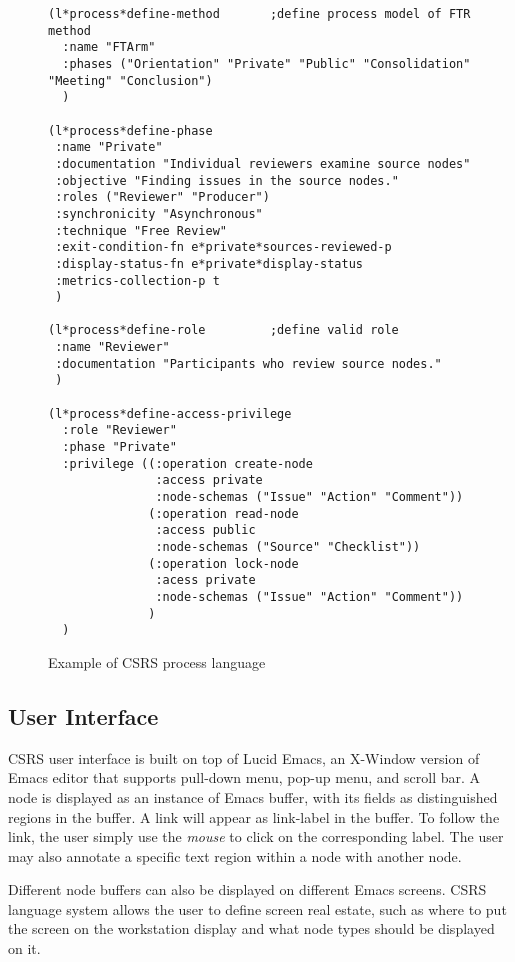 \begin{figure}[tp]
  \footnotesize
  \begin{verbatim}
(l*process*define-method       ;define process model of FTR method
  :name "FTArm"                
  :phases ("Orientation" "Private" "Public" "Consolidation" "Meeting" "Conclusion")
  )

(l*process*define-phase
 :name "Private"
 :documentation "Individual reviewers examine source nodes"
 :objective "Finding issues in the source nodes."
 :roles ("Reviewer" "Producer")
 :synchronicity "Asynchronous"
 :technique "Free Review"
 :exit-condition-fn e*private*sources-reviewed-p
 :display-status-fn e*private*display-status
 :metrics-collection-p t
 )

(l*process*define-role         ;define valid role
 :name "Reviewer"
 :documentation "Participants who review source nodes."
 )

(l*process*define-access-privilege 
  :role "Reviewer"
  :phase "Private"
  :privilege ((:operation create-node 
               :access private 
               :node-schemas ("Issue" "Action" "Comment"))
              (:operation read-node 
               :access public 
               :node-schemas ("Source" "Checklist"))
              (:operation lock-node
               :acess private
               :node-schemas ("Issue" "Action" "Comment"))
              )
  )
  \end{verbatim}
  \normalsize
  \caption{Example of CSRS process language}
  \label{fig:process-language}
\end{figure}


\subsection{User Interface}
CSRS user interface is built on top of Lucid Emacs, an X-Window
version of Emacs editor that supports pull-down menu, pop-up menu, and
scroll bar. A node is displayed as an instance of Emacs
buffer, with its fields as distinguished regions in the buffer. A link
will appear as link-label in the buffer. To follow the link, the user
simply use the {\it mouse} to click on the corresponding label. The
user may also annotate a 
specific text region within a node with another node.

Different node buffers can also be displayed on different Emacs screens. 
CSRS language system allows the user to define screen real estate,
such as where to put the screen on the workstation display and
what node types should be displayed on it.

